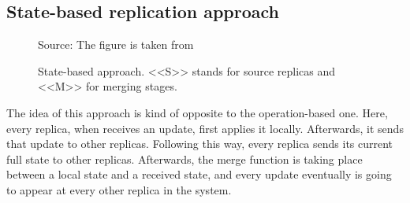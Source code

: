 \subsection*{State-based replication approach}

\begin{figure}[!htb]
    \begin{center}
    \def\svgwidth{\linewidth}
    
      {\scriptsize%
     Source: The figure is taken from \cite{2}}
    \caption {State-based approach. <<S>> stands for source replicas and <<M>> for merging stages.}
    \label{fig:theory2}
\end{center}
\end{figure}

The idea of this approach is kind of opposite to the operation-based one. Here, every replica, when receives an update, first applies it locally. Afterwards, it sends that update to other replicas. Following this way, every replica sends its current full state to other replicas. Afterwards, the merge function is taking place between a local state and a received state, and every update eventually is going to appear at every other replica in the system. 